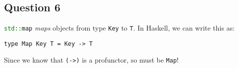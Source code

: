 \subsection*{Question 6}

\lstinline[language=C++]{std::map} \textit{maps} objects from type
\lstinline{Key} to \lstinline{T}. In Haskell, we can write this as:

\begin{lstlisting}
type Map Key T = Key -> T
\end{lstlisting}

Since we know that \lstinline{(->)} is a profunctor, so must be \lstinline{Map}!
